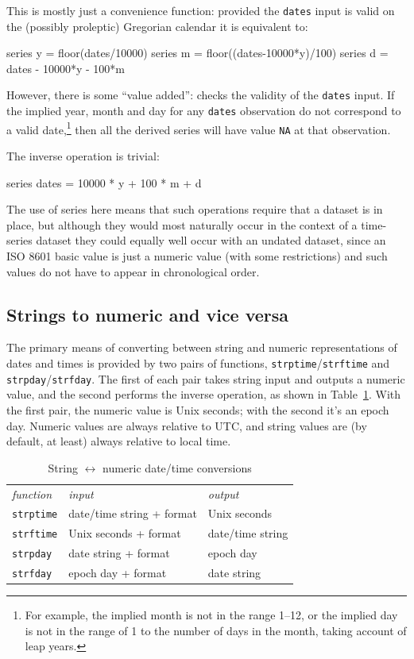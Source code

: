 This is mostly just a convenience function: provided the
\texttt{dates} input is valid on the (possibly proleptic) Gregorian
calendar it is equivalent to:
%
\begin{code}
series y = floor(dates/10000)
series m = floor((dates-10000*y)/100)
series d = dates - 10000*y - 100*m
\end{code}

However, there is some ``value added'':  checks the
validity of the \texttt{dates} input. If the implied year, month and
day for any \texttt{dates} observation do not correspond to a valid
date,\footnote{For example, the implied month is not in the range
  1--12, or the implied day is not in the range of 1 to the number of
  days in the month, taking account of leap years.} then all the
derived series will have value \texttt{NA} at that observation.

The inverse operation is trivial:
\begin{code}
series dates = 10000 * y + 100 * m + d
\end{code}

The use of series here means that such operations require that a
dataset is in place, but although they would most naturally occur in
the context of a time-series dataset they could equally well occur
with an undated dataset, since an ISO 8601 basic value is just a
numeric value (with some restrictions) and such values do not have to
appear in chronological order.

\subsection{Strings to numeric and vice versa}

The primary means of converting between string and numeric
representations of dates and times is provided by two pairs of
functions, \texttt{strptime}/\texttt{strftime} and
\texttt{strpday}/\texttt{strfday}. The first of each pair takes string
input and outputs a numeric value, and the second performs the inverse
operation, as shown in Table~\ref{tab:timeconv}. With the first pair,
the numeric value is Unix seconds; with the second it's an epoch day.
Numeric values are always relative to UTC, and string values are (by
default, at least) always relative to local time.

\begin{table}[htbp]
  \centering
  \begin{tabular}{lll}
    \textit{function} & \textit{input} & \textit{output} \\[6pt]
    \texttt{strptime} & date/time string + format & Unix seconds \\
    \texttt{strftime} & Unix seconds + format & date/time string \\[4pt]
    \texttt{strpday}  & date string + format & epoch day \\
    \texttt{strfday}  & epoch day + format & date string
  \end{tabular}
  \caption{String $\longleftrightarrow$ numeric date/time conversions}
  \label{tab:timeconv}
\end{table}

